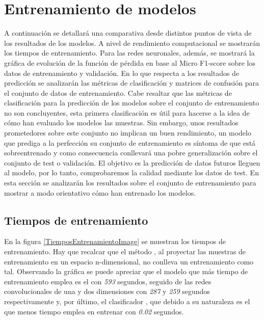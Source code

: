 \section{Entrenamiento de modelos}

  A continuación se detallará una comparativa desde distintos puntos de vista de los resultados de los modelos. A nivel de rendimiento computacional se mostrarán los tiempos de entrenamiento. Para las redes neuronales, además, se mostrará la gráfica de evolución de la función de pérdida en base al Micro F1-score sobre los datos de entrenamiento y validación. En lo que respecta a los resultados de predicción se analizarán las métricas de clasificación y matrices de confusión para el conjunto de datos de entrenamiento. Cabe resaltar que las métricas de clasificación para la predicción de los modelos sobre el conjunto de entrenamiento no son concluyentes, esta primera clasificación es útil para hacerse a la idea de cómo han evaluado los modelos las muestras. Sin embargo, unos resultados prometedores sobre este conjunto no implican un buen rendimiento, un modelo que prediga a la perfección su conjunto de entrenamiento es síntoma de que está sobreentrenado y como consecuencia conllevará una pobre generalización sobre el conjunto de test o validación.  El objetivo es la predicción de datos futuros lleguen al modelo, por lo tanto, comprobaremos la calidad mediante los datos de test. En esta sección se analizarán los resultados sobre el conjunto de entrenamiento para mostrar a modo orientativo cómo han entrenado los modelos.

  \subsection{Tiempos de entrenamiento}

    En la figura \eqref{TiemposEntrenamientoImage} se muestran los tiempos de entrenamiento. Hay que recalcar que el método , al proyectar las muestras de entrenamiento en un espacio n-dimensional, no conlleva un entrenamiento como tal. Observando la gráfica se puede apreciar que el modelo que más tiempo de entrenamiento emplea es el  con \textit{593} segundos, seguido de las redes convolucionales de una y dos dimensiones con \textit{287} y \textit{259} segundos respectivamente y, por último, el clasificador , que debido a su naturaleza es el que menos tiempo emplea en entrenar con \textit{0.02} segundos. 


